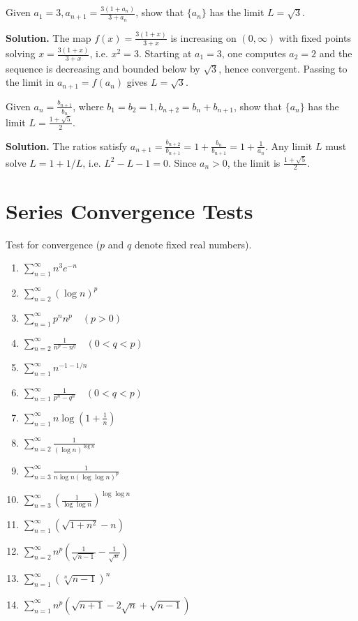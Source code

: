 \begin{problembox}
Given \(a_1 = 3, a_{n+1} = \frac{3(1 + a_n)}{3 + a_n}\), show that \(\{a_n\}\) has the limit \(L = \sqrt{3}\).
\end{problembox}

\noindent\textbf{Solution.}
The map \(f(x)=\tfrac{3(1+x)}{3+x}\) is increasing on \((0,\infty)\) with fixed points solving \(x=\tfrac{3(1+x)}{3+x}\), i.e. \(x^2=3\). Starting at \(a_1=3\), one computes \(a_2=2\) and the sequence is decreasing and bounded below by \(\sqrt{3}\), hence convergent. Passing to the limit in \(a_{n+1}=f(a_n)\) gives \(L=\sqrt{3}\).

\begin{problembox}
Given \(a_n = \frac{b_{n+1}}{b_n}\), where \(b_1 = b_2 = 1, b_{n+2} = b_n + b_{n+1}\), show that \(\{a_n\}\) has the limit \(L = \frac{1 + \sqrt{5}}{2}\).
\end{problembox}

\noindent\textbf{Solution.}
The ratios satisfy \(a_{n+1}=\tfrac{b_{n+2}}{b_{n+1}}=1+\tfrac{b_n}{b_{n+1}}=1+\tfrac{1}{a_n}\). Any limit \(L\) must solve \(L=1+1/L\), i.e. \(L^2-L-1=0\). Since \(a_n>0\), the limit is \(\tfrac{1+\sqrt{5}}{2}\).

\section{Series Convergence Tests}

\begin{problembox}
Test for convergence (\(p\) and \(q\) denote fixed real numbers).
\begin{enumerate}[label=\alph*)]
\item \(\sum_{n=1}^{\infty} n^3 e^{-n}\)
\item \(\sum_{n=2}^{\infty} (\log n)^p\)
\item \(\sum_{n=1}^{\infty} p^n n^p \quad (p > 0)\)
\item \(\sum_{n=2}^{\infty} \frac{1}{n^p - n^q} \quad (0 < q < p)\)
\item \(\sum_{n=1}^{\infty} n^{-1-1/n}\)
\item \(\sum_{n=1}^{\infty} \frac{1}{p^n - q^n} \quad (0 < q < p)\)
\item \(\sum_{n=1}^{\infty} n \log \left(1 + \frac{1}{n}\right)\)
\item \(\sum_{n=2}^{\infty} \frac{1}{(\log n)^{\log n}}\)
\item \(\sum_{n=3}^{\infty} \frac{1}{n \log n (\log \log n)^p}\)
\item \(\sum_{n=3}^{\infty} \left( \frac{1}{\log \log n} \right)^{\log \log n}\)
\item \(\sum_{n=1}^{\infty} (\sqrt{1 + n^2} - n)\)
\item \(\sum_{n=2}^{\infty} n^p \left( \frac{1}{\sqrt{n - 1}} - \frac{1}{\sqrt{n}} \right)\)
\item \(\sum_{n=1}^{\infty} (\sqrt[n]{n - 1})^n\)
\item \(\sum_{n=1}^{\infty} n^p (\sqrt{n + 1} - 2\sqrt{n} + \sqrt{n - 1})\)
\end{enumerate}
\end{problembox}

